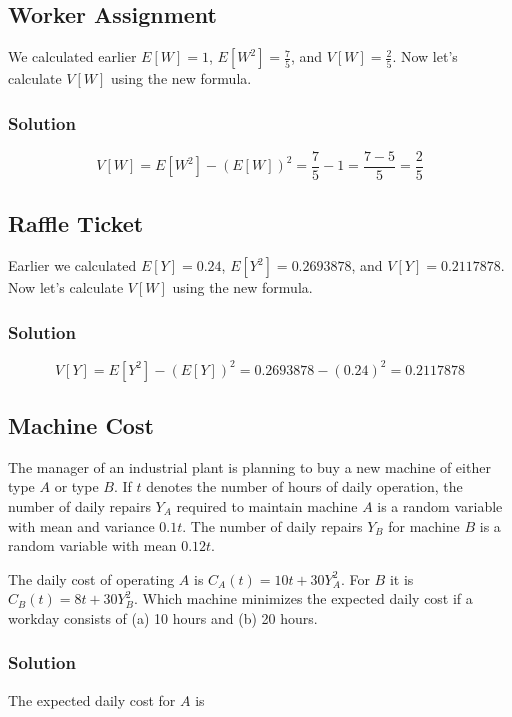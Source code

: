 \documentclass[11pt]{article}
\theoremstyle{definition}
\begin{document}
\subsection{Worker Assignment}

We calculated earlier $E[W]=1$, $E[W^2]=\frac{7}{5}$, and $V[W]=\frac{2}{5}$. Now let's calculate $V[W]$ using the new formula.

\subsubsection*{Solution}

$$
	V[W] = E[W^2] - (E[W])^2 = \frac{7}{5} - 1 = \frac{7-5}{5} = \frac{2}{5}
$$

\subsection{Raffle Ticket}

Earlier we calculated $E[Y] = 0.24$, $E[Y^2] = 0.2693878$, and $V[Y]=0.2117878$. Now let's calculate $V[W]$ using the new formula.

\subsubsection*{Solution}

$$
	V[Y] = E[Y^2] - (E[Y])^2 = 0.2693878 - (0.24)^2 = 0.2117878
$$

\subsection{Machine Cost}

The manager of an industrial plant is planning to buy a new machine of either type $A$ or type $B$. If $t$ denotes the number of hours of daily operation, the number of daily repairs $Y_A$ required to maintain machine $A$ is a random variable with mean and variance $0.1t$. The number of daily repairs $Y_B$ for machine $B$ is a random variable with mean $0.12t$.

The daily cost of operating $A$ is $C_A(t)=10t+30Y_A^2$. For $B$ it is $C_B(t)=8t+30Y_B^2$. Which machine minimizes the expected daily cost if a workday consists of (a) 10 hours and (b) 20 hours.

\subsubsection*{Solution}

The expected daily cost for $A$ is
\end{document}
